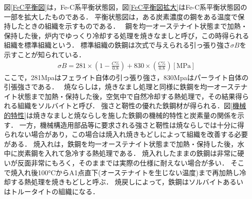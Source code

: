 \documentclass[a4paper,11pt,uplatex]{jsarticle}
\begin{document}
図\ref{FeC平衡図}は，Fe-C系平衡状態図，図\ref{FeC平衡図拡大}はFe-C系平衡状態図の一部を拡大したものである．
平衡状態図は，ある炭素濃度の鋼をある温度で保持したときの組織を示すものである．　
鋼を均一オーステナイト状態まで加熱・保持した後，炉内でゆっくり冷却する処理を焼きなましと呼び，この時得られる組織を標準組織という．
標準組織の鉄鋼は次式で与えられる引っ張り強さ$\sigma B$を示すことが知られている．
\begin{align}
  \sigma B=  281\times(1−\frac{C\%}{0.8})+  830\times(\frac{C\%}{0.8}) [\mathrm{MPa}]
\end{align}
ここで，281Mpaはフェライト自体の引っ張り強さ，830Mpaはパーライト自体の引張強さである．　
焼ならしは，焼きなまし処理と同様に鉄鋼を均一オーステナイト状態まで加熱・保持した後，空気中で自然冷却する熱処理で，その結果得られる組織をソルバイトと呼び．
強さと靭性の優れた鉄鋼材が得られる．図\ref{機械的特性}は焼きなましと焼ならしを施した鉄鋼の機械的特性と炭素量の関係を示す．
一方，機械構造用部品等に要求される強さと靭性は焼ならしでは十分に得られない場合があり，この場合は焼入れ焼きもどしによって組織を改善する必要がある．
焼入れは，鉄鋼を均一オーステナイト状態まで加熱・保持した後，水中に炭素鋼を入れて急冷する熱処理である．
焼入れしたままの鉄鋼は非常に硬いが反面非常にもろく，そのままでは実際の仕様に耐えない場合が多い．
そこで焼入れ後100°CからA1点直下(オーステナイトを生じない温度)まで再加熱し冷却する熱処理を焼きもどしと呼ぶ．
焼戻しによって，鉄鋼はソルバイトあるいはトルータイトの組織になる．
\end{document}
